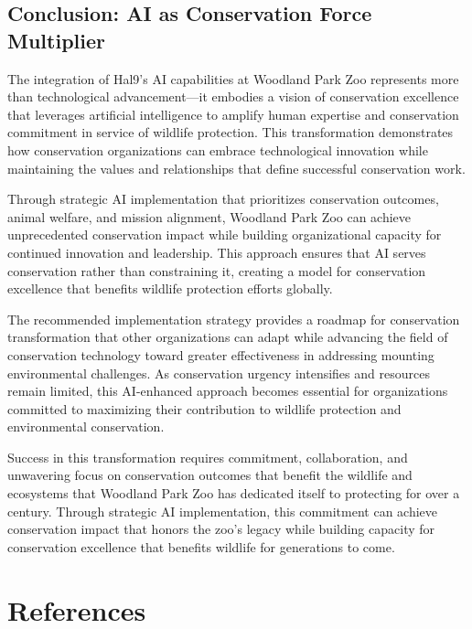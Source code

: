 \documentclass[
  Letterpaper,
]{scrbook}
\begin{document}
\section*{Conclusion: AI as Conservation Force
Multiplier}\label{conclusion-ai-as-conservation-force-multiplier}


The integration of Hal9's AI capabilities at Woodland Park Zoo
represents more than technological advancement---it embodies a vision of
conservation excellence that leverages artificial intelligence to
amplify human expertise and conservation commitment in service of
wildlife protection. This transformation demonstrates how conservation
organizations can embrace technological innovation while maintaining the
values and relationships that define successful conservation work.

Through strategic AI implementation that prioritizes conservation
outcomes, animal welfare, and mission alignment, Woodland Park Zoo can
achieve unprecedented conservation impact while building organizational
capacity for continued innovation and leadership. This approach ensures
that AI serves conservation rather than constraining it, creating a
model for conservation excellence that benefits wildlife protection
efforts globally.

The recommended implementation strategy provides a roadmap for
conservation transformation that other organizations can adapt while
advancing the field of conservation technology toward greater
effectiveness in addressing mounting environmental challenges. As
conservation urgency intensifies and resources remain limited, this
AI-enhanced approach becomes essential for organizations committed to
maximizing their contribution to wildlife protection and environmental
conservation.

Success in this transformation requires commitment, collaboration, and
unwavering focus on conservation outcomes that benefit the wildlife and
ecosystems that Woodland Park Zoo has dedicated itself to protecting for
over a century. Through strategic AI implementation, this commitment can
achieve conservation impact that honors the zoo's legacy while building
capacity for conservation excellence that benefits wildlife for
generations to come.


\chapter*{References}\label{references}
\end{document}
